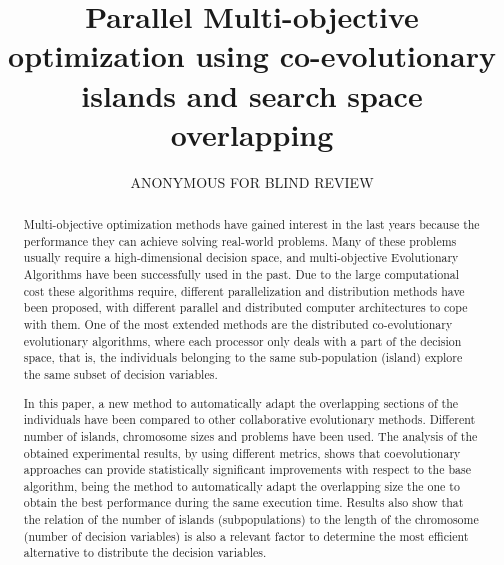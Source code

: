 \documentclass[Crown,sagev,times,doublespace]{sagej}
\begin{document}
\title{Parallel Multi-objective optimization using co-evolutionary islands and search space overlapping}

\author{ANONYMOUS FOR BLIND REVIEW }





\begin{abstract}
Multi-objective optimization methods have gained interest in the last years because the performance they can achieve solving real-world problems. Many of these problems usually require a high-dimensional decision space, and multi-objective Evolutionary Algorithms have been successfully used in the past. Due to the large computational cost these algorithms require, different parallelization and distribution methods have been proposed, with different parallel and distributed computer architectures to cope with them. One of the most extended methods are the distributed co-evolutionary evolutionary algorithms, where each processor only deals with a part of the decision space, that is, the individuals belonging to the same sub-population (island) explore the same subset of decision variables.  

In this paper, a new method to automatically adapt the overlapping sections of the individuals have been compared to other collaborative evolutionary methods.
Different number of islands, chromosome sizes and problems have been used. The analysis of the obtained experimental results, by using different 
metrics, shows that coevolutionary approaches can provide statistically significant improvements with respect to the base algorithm, being the method to automatically adapt the overlapping size the one to obtain the best performance during the same execution time. Results also show that the relation of the number of 
islands (subpopulations) to the length of the chromosome (number of decision variables) is also a relevant factor to determine the most efficient alternative to distribute the decision variables.
\end{abstract}
\end{document}
